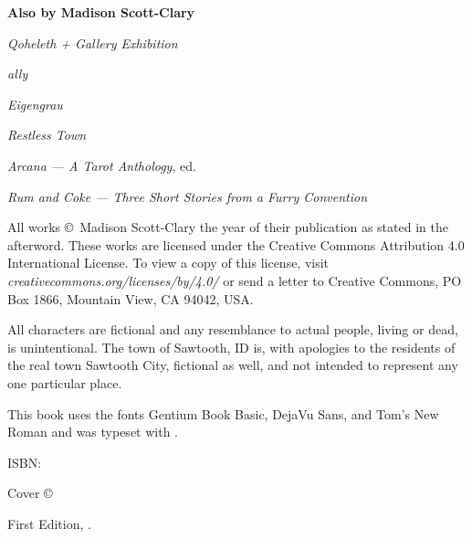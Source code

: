 
\thispagestyle{empty}
\null
\vfill
\begin{center}
    \textbf{Also by Madison Scott-Clary}

    \emph{Qoheleth + Gallery Exhibition}

    \emph{ally}

    \emph{Eigengrau}

    \emph{Restless Town}

    \emph{Arcana --- A Tarot Anthology}, ed.

    \emph{Rum and Coke --- Three Short Stories from a Furry Convention}
\end{center}
\vfill
\singlespacing
{\small\parindent0pt\parskip5pt
\noindent All works \copyright\ Madison Scott-Clary the year of their publication as stated in the afterword. These works are licensed under the Creative Commons Attribution 4.0 International License. To view a copy of this license, visit \mbox{\emph{creativecommons.org/licenses/by/4.0/}} or send a letter to Creative Commons, PO Box 1866, Mountain View, CA 94042, USA.

All characters are fictional and any resemblance to actual people, living or dead, is unintentional. The town of Sawtooth, ID is, with apologies to the residents of the real town Sawtooth City, fictional as well, and not intended to represent any one particular place.

This book uses the fonts Gentium Book Basic, DejaVu Sans, and Tom's New Roman and was typeset with {\XeLaTeX}.

\vspace{1ex}

ISBN: \ISBN

\vspace{1ex}

\emph{\Title}

\vspace{1ex}

Cover \copyright\ \Year\ \Illustrator\\
\IllustratorWeb

\vspace{1ex}

First Edition, \Year.

\EditionsList
}

\cleardoublepage

